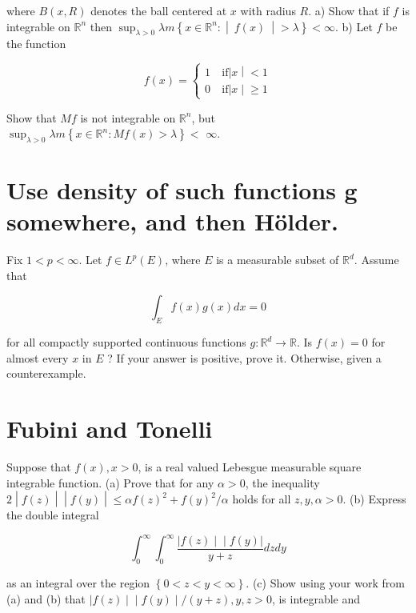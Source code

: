 where \(B(x,R)\) denotes the ball centered at \(x\) with radius \(R\). a) Show that if \(f\) is integrable on \(\mathbb{R}^{n}\) then \(\sup_{\lambda > 0}\lambda m\left\{ x \in \mathbb{R}^{n}: \middle| \ f(x)\  \middle| > \lambda \right\} < \infty\). b) Let \(f\) be the function

\[f(x) = \left\{ \begin{matrix}
{1\ } & {\text{if}\left| x \middle| < 1 \right.} \\
{0\ } & {\text{if}\left| x \middle| \geq 1 \right.}
\end{matrix} \right.\]

Show that \(Mf\) is not integrable on \(\mathbb{R}^{n}\), but \(\sup_{\lambda > 0}\lambda m\left\{ {x \in \mathbb{R}^{n}:Mf(x) > \lambda} \right\} <\) \(\infty\).

\chapter{Use density of such functions g somewhere, and then Hölder.}

Fix \(1 < p < \infty\). Let \(f \in L^{p}(E)\), where \(E\) is a measurable subset of \(\mathbb{R}^{d}\). Assume that

\[\int_{E}f(x)g(x)dx = 0\]

for all compactly supported continuous functions \(g:\mathbb{R}^{d}\rightarrow\mathbb{R}\). Is \(f(x) = 0\) for almost every \(x\) in \(E\) ? If your answer is positive, prove it. Otherwise, given a counterexample.

\chapter{Fubini and Tonelli}\label{fubini-and-tonelli}

Suppose that \(f(x),x > 0\), is a real valued Lebesgue measurable square integrable function. (a) Prove that for any \(\alpha > 0\), the inequality \(\left. 2 \middle| f(z) \middle| \middle| f(y) \middle| \leq \alpha f(z)^{2} + f(y)^{2}/\alpha \right.\) holds for all \(z,y,\alpha > 0\). (b) Express the double integral

\[\int_{0}^{\infty}\int_{0}^{\infty}\frac{\left. |f(z) \middle| \middle| f(y)| \right.}{y + z}dzdy\]

as an integral over the region \(\left\{ {0 < z < y < \infty} \right\}\). (c) Show using your work from (a) and (b) that \(\left. |f(z) \middle| \middle| f(y) \middle| /(y + z),y,z > 0 \right.\), is integrable and

